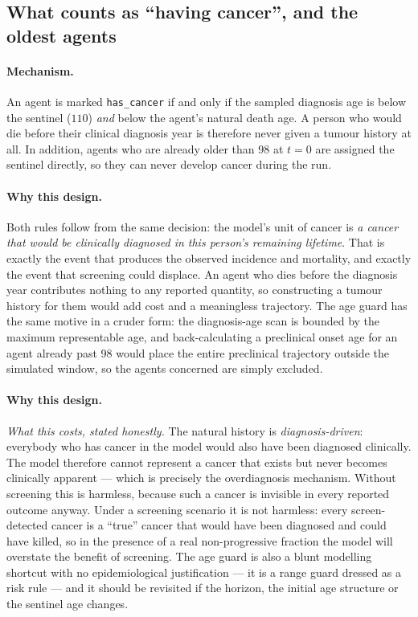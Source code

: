 \documentclass[12pt,a4paper]{article}
\newcommand{\id}[1]{\texttt{#1}}
\newcommand{\mech}[1]{\paragraph{Mechanism.} #1}
\newcommand{\why}[1]{\paragraph{Why this design.} #1}
\begin{document}
\subsection{What counts as ``having cancer'', and the oldest agents}

\mech{An agent is marked \id{has\_cancer} if and only if the sampled diagnosis age is below the sentinel
($110$) \emph{and} below the agent's natural death age. A person who would die before their clinical
diagnosis year is therefore never given a tumour history at all. In addition, agents who are already
older than 98 at $t=0$ are assigned the sentinel directly, so they can never develop cancer during the
run.}

\why{Both rules follow from the same decision: the model's unit of cancer is \emph{a cancer that would be
clinically diagnosed in this person's remaining lifetime}. That is exactly the event that produces the
observed incidence and mortality, and exactly the event that screening could displace. An agent who dies
before the diagnosis year contributes nothing to any reported quantity, so constructing a tumour history
for them would add cost and a meaningless trajectory. The age guard has the same motive in a cruder form:
the diagnosis-age scan is bounded by the maximum representable age, and back-calculating a preclinical
onset age for an agent already past 98 would place the entire preclinical trajectory outside the
simulated window, so the agents concerned are simply excluded.}

\why{\emph{What this costs, stated honestly.} The natural history is \emph{diagnosis-driven}: everybody
who has cancer in the model would also have been diagnosed clinically. The model therefore cannot
represent a cancer that exists but never becomes clinically apparent --- which is precisely the
overdiagnosis mechanism. Without screening this is harmless, because such a cancer is invisible in every
reported outcome anyway. Under a screening scenario it is not harmless: every screen-detected cancer is a
``true'' cancer that would have been diagnosed and could have killed, so in the presence of a real
non-progressive fraction the model will overstate the benefit of screening. The age guard is also a blunt
modelling shortcut with no epidemiological justification --- it is a range guard dressed as a risk rule
--- and it should be revisited if the horizon, the initial age structure or the sentinel age changes.}
\end{document}
